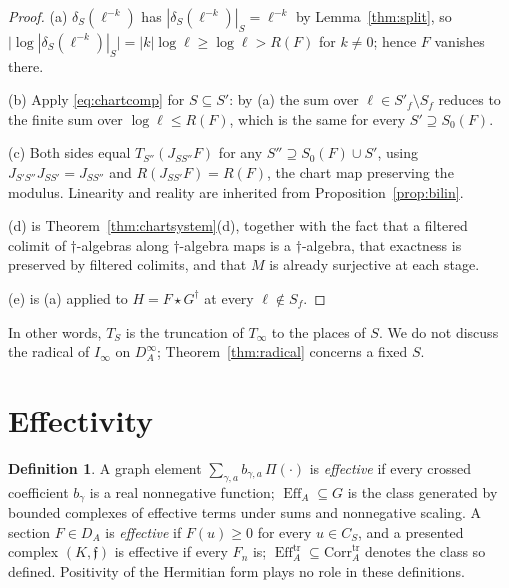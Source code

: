 \documentclass[11pt]{amsart}
\theoremstyle{definition}
\newtheorem{definition}[theorem]{Definition}
\theoremstyle{remark}
\newcommand{\Eff}{\operatorname{Eff}}
\newcommand{\DA}{D_A}
\newcommand{\Corrtr}{\mathrm{Corr}^{\mathrm{tr}}_{A}}
\begin{document}
\begin{proof}
(a)  $\delta_S(\ell^{-k})$ has $|\delta_S(\ell^{-k})|_S=\ell^{-k}$ by
Lemma~\ref{thm:split}, so
$\bigl|\log|\delta_S(\ell^{-k})|_S\bigr|=|k|\log\ell\ge\log\ell>R(F)$ for
$k\ne0$; hence $F$ vanishes there.

(b)  Apply \eqref{eq:chartcomp} for $S\subseteq S'$: by (a) the sum over
$\ell\in S'_f\setminus S_f$ reduces to the finite sum over $\log\ell\le R(F)$,
which is the same for every $S'\supseteq S_0(F)$.

(c)  Both sides equal $T_{S''}(J_{SS''}F)$ for any $S''\supseteq S_0(F)\cup S'$, using
$J_{S'S''}J_{SS'}=J_{SS''}$ and $R(J_{SS'}F)=R(F)$, the chart map preserving the
modulus.  Linearity and reality are inherited from
Proposition~\ref{prop:bilin}.

(d) is Theorem~\ref{thm:chartsystem}(d), together with the fact that a filtered
colimit of $\dagger$-algebras along $\dagger$-algebra maps is a
$\dagger$-algebra, that exactness is preserved by filtered colimits, and that
$M$ is already surjective at each stage.

(e) is (a) applied to $H=F\star G^{\dagger}$ at every $\ell\notin S_f$.
\end{proof}

In other words, $T_S$ is the truncation of $T_{\infty}$ to the places of $S$.
We do not discuss the radical of $I_{\infty}$ on $\DA^{\infty}$;
Theorem~\ref{thm:radical} concerns a fixed $S$.

\section{Effectivity}\label{sec:eff}

\begin{definition}\label{def:eff}
A graph element $\sum_{\gamma,a}b_{\gamma,a}\,\Pi(\cdot)$ is \emph{effective}
if every crossed coefficient $b_{\gamma}$ is a real nonnegative function;
$\Eff_A\subseteq G$ is the class generated by bounded complexes of effective
terms under sums and nonnegative scaling.  A section $F\in\DA$ is
\emph{effective} if $F(u)\ge0$ for every $u\in C_S$, and a presented complex
$(K,\mathfrak f)$ is effective if every $F_n$ is; $\Eff_A^{\mathrm{tr}}
\subseteq\Corrtr$ denotes the class so defined.  Positivity of the Hermitian
form plays no role in these definitions.
\end{definition}
\end{document}
